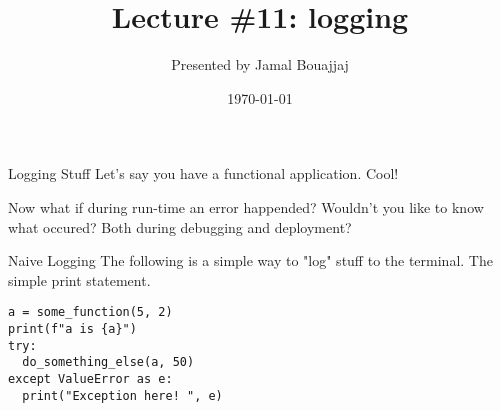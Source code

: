 %
%



\title{Lecture \#11: logging}
\date{\today}
\author{Presented by Jamal Bouajjaj}

\makeatletter
{}%
\makeatother



\maketitle

\begin{frame}{Logging Stuff}
  Let's say you have a functional application. Cool!\pause

  Now what if during run-time an error happended? Wouldn't you like to know what occured?
  Both during debugging and deployment?
\end{frame}

\begin{frame}[containsverbatim]{Naive Logging}
  The following is a simple way to "log" stuff to the terminal. The simple print statement.
\begin{verbatim}
a = some_function(5, 2)
print(f"a is {a}")
try:
  do_something_else(a, 50)
except ValueError as e:
  print("Exception here! ", e)
\end{verbatim}
\end{frame}

